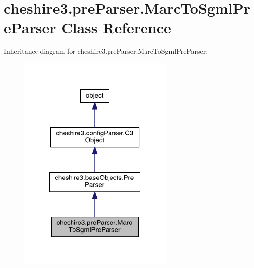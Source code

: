 \hypertarget{classcheshire3_1_1pre_parser_1_1_marc_to_sgml_pre_parser}{\section{cheshire3.\-pre\-Parser.\-Marc\-To\-Sgml\-Pre\-Parser Class Reference}
\label{classcheshire3_1_1pre_parser_1_1_marc_to_sgml_pre_parser}
}


Inheritance diagram for cheshire3.\-pre\-Parser.\-Marc\-To\-Sgml\-Pre\-Parser\-:
\nopagebreak
\begin{figure}[H]
\begin{center}
\leavevmode
\includegraphics[width=216pt]{classcheshire3_1_1pre_parser_1_1_marc_to_sgml_pre_parser__inherit__graph}
\end{center}
\end{figure}


